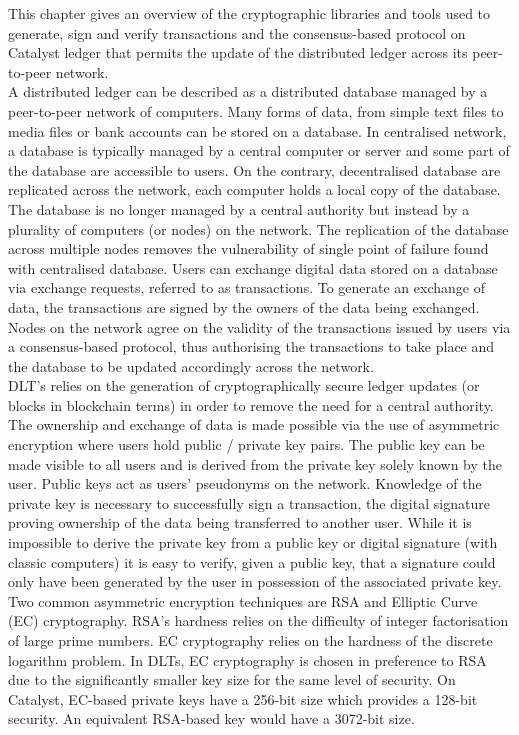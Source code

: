 This chapter gives an overview of the cryptographic libraries and tools used to generate, sign and verify transactions and the consensus-based protocol on Catalyst ledger that permits the update of the distributed ledger across its peer-to-peer network. \\

A distributed ledger can be described as a distributed database managed by a peer-to-peer network of computers. Many forms of data, from simple text files to media files or bank accounts can be stored on a database. In centralised network, a database is typically managed by a central computer or server and some part of the database are accessible to users. On the contrary, decentralised database are replicated across the network, each computer holds a local copy of the database. The database is no longer managed by a central authority but instead by a plurality of computers (or nodes) on the network. The replication of the database across multiple nodes removes the vulnerability of single point of failure found with centralised database. Users can exchange digital data stored on a database via exchange requests, referred to as transactions. To generate an exchange of data, the transactions are signed by the owners of the data being exchanged. Nodes on the network agree on the validity of the transactions issued by users via a consensus-based protocol, thus authorising the transactions to take place and the database to be updated accordingly across the network. \\

DLT's relies on the generation of cryptographically secure ledger updates (or blocks in blockchain terms) in order to remove the need for a central authority. The ownership and exchange of data is made possible via the use of asymmetric encryption where users hold public / private key pairs. The public key can be made visible to all users and is derived from the private key solely known by the user. Public keys act as users' pseudonyms on the network. Knowledge of the private key is necessary to successfully sign a transaction, the digital signature proving ownership of the data being transferred to another user. While it is impossible to derive the private key from a public key or digital signature (with classic computers) it is easy to verify, given a public key, that a signature could only have been generated by the user in possession of the associated private key. \\

Two common asymmetric encryption techniques are RSA and Elliptic Curve (EC) cryptography. RSA's hardness relies on the difficulty of integer factorisation of large prime numbers.  EC cryptography relies on the hardness of the discrete logarithm problem. In DLTs, EC cryptography is chosen in preference to RSA due to the significantly smaller key size for the same level of security. On Catalyst, EC-based private keys have a 256-bit size which provides a 128-bit security. An equivalent RSA-based key would have a 3072-bit size.

